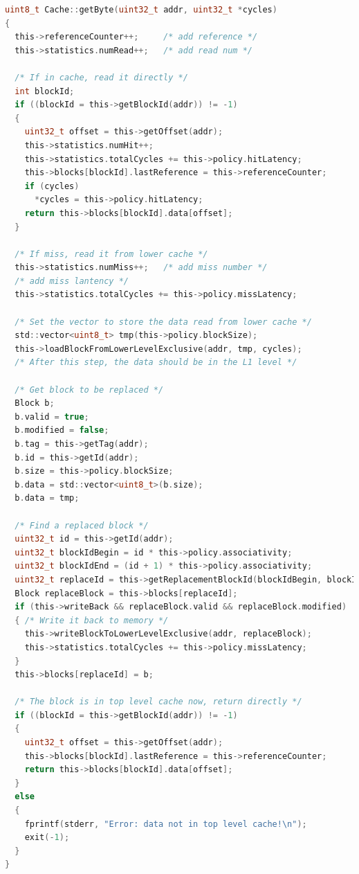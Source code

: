 \documentclass{article}
\begin{document}
\begin{lstlisting}[language=c]
uint8_t Cache::getByte(uint32_t addr, uint32_t *cycles)
{
  this->referenceCounter++;     /* add reference */
  this->statistics.numRead++;   /* add read num */

  /* If in cache, read it directly */
  int blockId;
  if ((blockId = this->getBlockId(addr)) != -1)
  {
    uint32_t offset = this->getOffset(addr);
    this->statistics.numHit++;
    this->statistics.totalCycles += this->policy.hitLatency;
    this->blocks[blockId].lastReference = this->referenceCounter;
    if (cycles)
      *cycles = this->policy.hitLatency;
    return this->blocks[blockId].data[offset];
  }

  /* If miss, read it from lower cache */
  this->statistics.numMiss++;   /* add miss number */
  /* add miss lantency */
  this->statistics.totalCycles += this->policy.missLatency;

  /* Set the vector to store the data read from lower cache */
  std::vector<uint8_t> tmp(this->policy.blockSize);
  this->loadBlockFromLowerLevelExclusive(addr, tmp, cycles);
  /* After this step, the data should be in the L1 level */

  /* Get block to be replaced */
  Block b;
  b.valid = true;
  b.modified = false;
  b.tag = this->getTag(addr);
  b.id = this->getId(addr);
  b.size = this->policy.blockSize;
  b.data = std::vector<uint8_t>(b.size);
  b.data = tmp;

  /* Find a replaced block */
  uint32_t id = this->getId(addr);
  uint32_t blockIdBegin = id * this->policy.associativity;
  uint32_t blockIdEnd = (id + 1) * this->policy.associativity;
  uint32_t replaceId = this->getReplacementBlockId(blockIdBegin, blockIdEnd);
  Block replaceBlock = this->blocks[replaceId];
  if (this->writeBack && replaceBlock.valid && replaceBlock.modified)
  { /* Write it back to memory */
    this->writeBlockToLowerLevelExclusive(addr, replaceBlock);
    this->statistics.totalCycles += this->policy.missLatency;
  }
  this->blocks[replaceId] = b;

  /* The block is in top level cache now, return directly */
  if ((blockId = this->getBlockId(addr)) != -1)
  {
    uint32_t offset = this->getOffset(addr);
    this->blocks[blockId].lastReference = this->referenceCounter;
    return this->blocks[blockId].data[offset];
  }
  else
  {
    fprintf(stderr, "Error: data not in top level cache!\n");
    exit(-1);
  }
}


\end{lstlisting}
\end{document}
